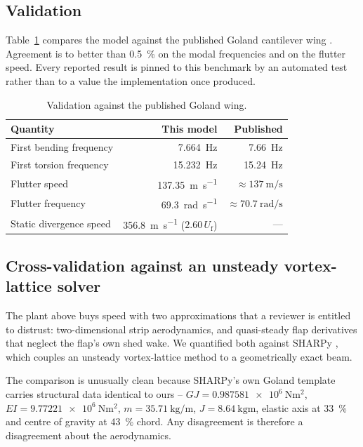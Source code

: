 \documentclass[11pt,a4paper]{article}
\newcommand{\Uf}{U_{\mathrm{f}}}
\begin{document}
\subsection{Validation}

Table~\ref{tab:validation} compares the model against the published Goland
cantilever wing \cite{goland1945}. Agreement is to better than \SI{0.5}{\percent}
on the modal frequencies and on the flutter speed. Every reported result is pinned
to this benchmark by an automated test rather than to a value the implementation
once produced.

\begin{table}[t]
\centering
\caption{Validation against the published Goland wing.}
\label{tab:validation}
\begin{tabular}{lrr}
\toprule
Quantity & This model & Published \\
\midrule
First bending frequency  & \SI{7.664}{\hertz}  & \SI{7.66}{\hertz} \\
First torsion frequency  & \SI{15.232}{\hertz} & \SI{15.24}{\hertz} \\
Flutter speed            & \SI{137.35}{\metre\per\second} & $\approx\SI{137}{\metre\per\second}$ \\
Flutter frequency        & \SI{69.3}{\radian\per\second}  & $\approx\SI{70.7}{\radian\per\second}$ \\
Static divergence speed  & \SI{356.8}{\metre\per\second} ($2.60\,\Uf$) & --- \\
\bottomrule
\end{tabular}
\end{table}

\subsection{Cross-validation against an unsteady vortex-lattice solver}
\label{sec:sharpy}

The plant above buys speed with two approximations that a reviewer is entitled to
distrust: two-dimensional strip aerodynamics, and quasi-steady flap derivatives
that neglect the flap's own shed wake. We quantified both against SHARPy
\cite{delcarre2019sharpy}, which couples an unsteady vortex-lattice method to a
geometrically exact beam.

The comparison is unusually clean because SHARPy's own Goland template carries
structural data identical to ours -- $GJ=\SI{0.987581e6}{\newton\metre\squared}$,
$EI=\SI{9.77221e6}{\newton\metre\squared}$, $m=\SI{35.71}{\kilo\gram\per\metre}$,
$J=\SI{8.64}{\kilo\gram\metre}$, elastic axis at \SI{33}{\percent} and centre of
gravity at \SI{43}{\percent} chord. Any disagreement is therefore a disagreement
about the aerodynamics.
\end{document}
